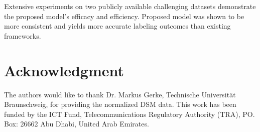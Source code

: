 \documentclass[journal]{IEEEtran}
\begin{document}
Extensive experiments on two publicly available challenging datasets demonstrate the proposed model's efficacy and efficiency. Proposed model was shown to be more consistent and yields more accurate labeling outcomes than existing frameworks. 



\section*{Acknowledgment}

The authors would like to thank Dr. Markus Gerke, Technische Universität Braunschweig, for providing the normalized DSM data. This work has been funded by the ICT Fund, Telecommunications Regulatory Authority (TRA), PO. Box: 26662 Abu Dhabi, United Arab Emirates.












\end{document}
